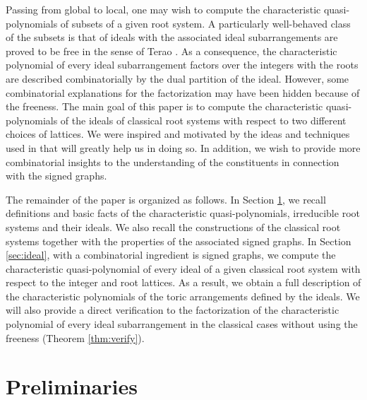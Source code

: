 \documentclass[12pt]{amsart}
\theoremstyle{plain}
\theoremstyle{definition}
\theoremstyle{remark}
\begin{document}
Passing from global to local, one may wish to compute the characteristic quasi-polynomials of subsets of a given root system. 
A particularly well-behaved class of the subsets is that of ideals with the associated ideal subarrangements are proved to be free in the sense of Terao \cite{ABCHT16}. 
As a consequence, the characteristic polynomial of every ideal subarrangement factors over the integers with the roots are described combinatorially by the dual partition of the ideal. 
However, some combinatorial explanations for the factorization may have been hidden because of the freeness.
The main goal of this paper is to compute the characteristic quasi-polynomials of the ideals of classical root systems with respect to two different choices of lattices. 
We were inspired and motivated by the ideas and techniques used in \cite{KTT07} that will greatly help us in doing so.
In addition, we wish to provide more combinatorial insights to the understanding of the constituents in connection with the signed graphs.

The remainder of the paper is organized as follows. 
In Section \ref{sec:background}, we recall definitions and basic facts of the characteristic quasi-polynomials, irreducible root systems and their ideals. 
We also recall the constructions of the classical root systems together with the properties of the associated signed graphs.
In Section \ref{sec:ideal}, with a combinatorial ingredient is signed graphs, we compute the characteristic quasi-polynomial of every ideal of a given classical root system with respect to the integer and root lattices. 
As a result, we obtain a full description of the characteristic polynomials of the toric arrangements defined by the ideals.
We will also provide a direct verification to the factorization of the characteristic polynomial of every ideal subarrangement in the classical cases without using the freeness (Theorem \ref{thm:verify}).
\medskip

 

\section{Preliminaries} 
\label{sec:background}
\end{document}
